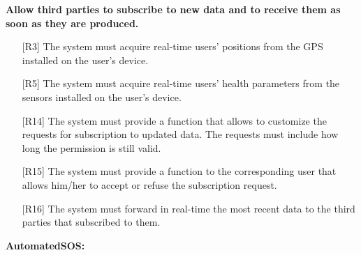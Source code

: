 \begin{enumerate} [label={\bf[G\arabic*]}]
    \item \textbf{Allow third parties to subscribe to new data and to receive them as soon as they are produced.}
        \begin{itemize}
            \item [{[R3]}] The system must acquire real-time users' positions from the GPS installed on the user's device.
            \item [{[R5]}] The system must acquire real-time users' health parameters from the sensors installed on the user's device.
            \item [{[R14]}] The system must provide a function that allows to customize the requests for subscription to updated data. The requests must include how long the permission is still valid.
            \item [{[R15]}] The system must provide a function to the corresponding user that allows him/her to accept or refuse the subscription request.
            \item [{[R16]}] The system must forward in real-time the most recent data to the third parties that subscribed to them.
        \end{itemize}
\end{enumerate}  
\noindent
\textbf{AutomatedSOS:}
